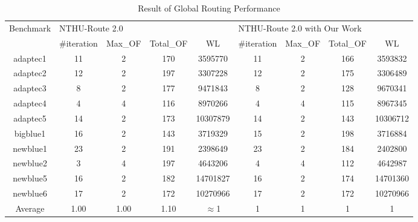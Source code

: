 \begin{table*}[htbp]
\caption{Result of Global Routing Performance}
\begin{center}
\begin{tabular}{|c|c|c|c|c|c|c|c|c|}
\hline
\multirow{2}{*}{Benchmark} & \multicolumn{4}{l|}{NTHU-Route 2.0}          & \multicolumn{4}{l|}{NTHU-Route 2.0 with Our Work} \\ \cline{2-9} 
                           & \#iteration & Max\_OF & Total\_OF & WL       & \#iteration   & Max\_OF  & Total\_OF  & WL        \\ \hline
adaptec1                   & 11          & 2       & 170       & 3595770  & 11            & 2        & 166        & 3593832   \\ \hline
adaptec2                   & 12          & 2       & 197       & 3307228  & 12            & 2        & 175        & 3306489   \\ \hline
adaptec3                   & 8           & 2       & 177       & 9471843  & 8             & 2        & 128        & 9670341   \\ \hline
adaptec4                   & 4           & 4       & 116       & 8970266  & 4             & 4        & 115        & 8967345   \\ \hline
adaptec5                   & 14          & 2       & 173       & 10307879 & 14            & 2        & 143        & 10306712  \\ \hline
bigblue1                   & 16          & 2       & 143       & 3719329  & 15            & 2        & 198        & 3716884   \\ \hline
newblue1                   & 23          & 2       & 191       & 2398649  & 23            & 2        & 184        & 2402800   \\ \hline
newblue2                   & 3           & 4       & 197       & 4643206  & 4             & 4        & 112        & 4642987   \\ \hline
newblue5                   & 16          & 2       & 182       & 14701827 & 16            & 2        & 174        & 14701360  \\ \hline
newblue6                   & 17          & 2       & 172       & 10270966 & 17            & 2        & 172        & 10270966  \\ \hline
Average                    & 1.00        & 1.00    & 1.10      & $\approx$1 & 1           & 1        & 1            & 1  \\ \hline
\end{tabular}
\label{tab:gr}
\end{center}
\end{table*}